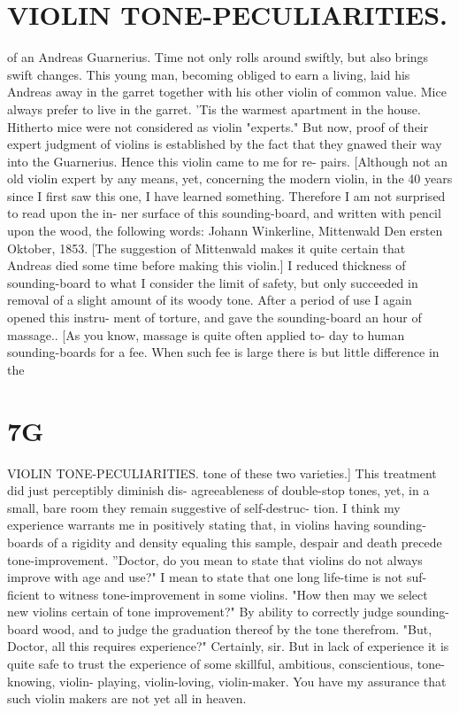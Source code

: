 \documentclass{article}
\begin{document}
\section*{VIOLIN TONE-PECULIARITIES.}
of an Andreas Guarnerius. Time not only rolls around swiftly, but also brings swift changes. This young man, becoming obliged to earn a living, laid his Andreas away in the garret together with his other violin of common value. Mice always prefer to live in the garret. 'Tis the warmest apartment in the house. Hitherto mice were not considered as violin "experts." But now, proof of their expert judgment of violins is established by the fact that they gnawed their way into the Guarnerius. Hence this violin came to me for re- pairs. [Although not an old violin expert by any means, yet, concerning the modern violin, in the 40 years since I first saw this one, I have learned something. Therefore I am not surprised to read upon the in- ner surface of this sounding-board, and written with pencil upon the wood, the following words: Johann Winkerline, Mittenwald Den ersten Oktober, 1853. [The suggestion of Mittenwald makes it quite certain that Andreas died some time before making this violin.] I reduced thickness of sounding-board to what I consider the limit of safety, but only succeeded in removal of a slight amount of its woody tone. After a period of use I again opened this instru- ment of torture, and gave the sounding-board an hour of massage.. [As you know, massage is quite often applied to- day to human sounding-boards for a fee. When such fee is large there is but little difference in the

\section*{7G}
VIOLIN TONE-PECULIARITIES. tone of these two varieties.] This treatment did just perceptibly diminish dis- agreeableness of double-stop tones, yet, in a small, bare room they remain suggestive of self-destruc- tion. I think my experience warrants me in positively stating that, in violins having sounding-boards of a rigidity and density equaling this sample, despair and death precede tone-improvement. ''Doctor, do you mean to state that violins do not always improve with age and use?" I mean to state that one long life-time is not suf- ficient to witness tone-improvement in some violins. "How then may we select new violins certain of tone improvement?" By ability to correctly judge sounding-board wood, and to judge the graduation thereof by the tone therefrom. "But, Doctor, all this requires experience?" Certainly, sir. But in lack of experience it is quite safe to trust the experience of some skillful, ambitious, conscientious, tone-knowing, violin- playing, violin-loving, violin-maker. You have my assurance that such violin makers are not yet all in heaven.
\end{document}
